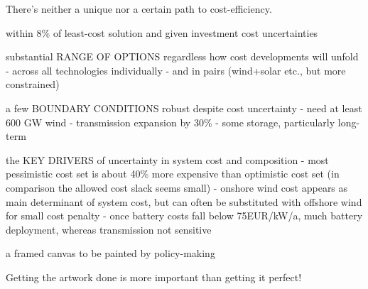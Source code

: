 
There's neither a unique nor a certain path to cost-efficiency.

within 8\% of least-cost solution and given investment cost uncertainties

substantial RANGE OF OPTIONS regardless how cost developments will unfold
- across all technologies individually
- and in pairs (wind+solar etc., but more constrained)

a few BOUNDARY CONDITIONS robust despite cost uncertainty
- need at least 600 GW wind
- transmission expansion by 30\%
- some storage, particularly long-term

the KEY DRIVERS of uncertainty in system cost and composition
- most pessimistic cost set is about 40\% more expensive than optimistic cost set (in comparison the allowed cost slack seems small)
- onshore wind cost appears as main determinant of system cost, but can often be substituted with offshore wind for small cost penalty
- once battery costs fall below 75EUR/kW/a, much battery deployment, whereas transmission not sensitive


a framed canvas to be painted by policy-making

Getting the artwork done is more important than getting it perfect!
